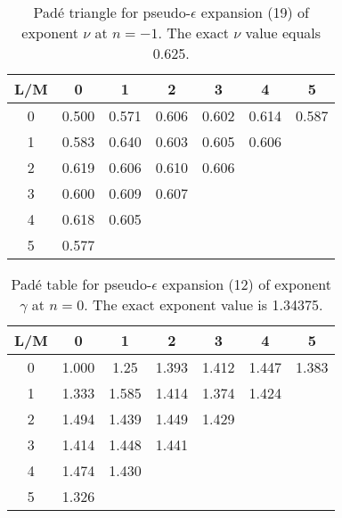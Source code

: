 \documentclass[aps,prb,preprint,showpacs,preprintnumbers,amsmath,amssymb]{revtex4}
\begin{document}
\begin{table}[t]
\caption{Pad\'e triangle for pseudo-$\epsilon$ expansion (19) of exponent
$\nu$ at $n = -1$. The exact $\nu$ value equals 0.625.}
\label{tab3}
\renewcommand{\tabcolsep}{0.4cm}
\begin{tabular}{|*{7}{c|}}
              \hline
              L/M & 0 & 1 & 2 & 3 & 4 & 5 \\ \hline
              0 & 0.500 & 0.571 & 0.606 & 0.602 & 0.614 & 0.587 \\ \hline
              1 & 0.583 & 0.640 & 0.603 & 0.605 & 0.606 &       \\ \hline
              2 & 0.619 & 0.606 & 0.610 & 0.606 &       &       \\ \hline
              3 & 0.600 & 0.609 & 0.607 &       &       &       \\ \hline
              4 & 0.618 & 0.605 &       &       &       &       \\ \hline
              5 & 0.577 &       &       &       &       &
               \\ \hline
\end{tabular}
\end{table}

\begin{table}[t]
\caption{Pad\'e table for pseudo-$\epsilon$ expansion (12) of exponent $\gamma$
at $n = 0$. The exact exponent value is 1.34375.}
\label{tab4}
\renewcommand{\tabcolsep}{0.4cm}
\begin{tabular}{|*{7}{c|}}
              \hline
              L/M & 0 & 1 & 2 & 3 & 4 & 5 \\ \hline
              0 & 1.000 & 1.25  & 1.393 & 1.412 & 1.447 & 1.383 \\ \hline
              1 & 1.333 & 1.585 & 1.414 & 1.374 & 1.424 &       \\ \hline
              2 & 1.494 & 1.439 & 1.449 & 1.429 &       &       \\ \hline
              3 & 1.414 & 1.448 & 1.441 &       &       &       \\ \hline
              4 & 1.474 & 1.430 &       &       &       &       \\ \hline
              5 & 1.326 &       &       &       &       &
               \\ \hline
\end{tabular}
\end{table}
\end{document}
